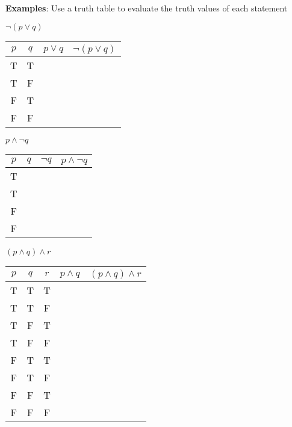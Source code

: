 \documentclass[addpoints]{exam}
\begin{document}
\textbf{Examples}: Use a truth table to evaluate the truth values of each statement
\begin{questions}
  \begin{minipage}{0.45\linewidth}
    \question $\lnot(p \lor q)$ \\ 
    \vspace{.01in}
      \begin{tabular}{ |c|c|c|c| } 
        \hline
        $p$ & $q$ & $p \lor q$ & $\lnot(p \lor q)$ \\ 
        \hline
        T & T & & \\ 
        T & F & & \\ 
        F & T & & \\ 
        F & F & & \\ 
        \hline
    \end{tabular}
    \vspace{0.01in}
  \end{minipage}
  \hfill
  \begin{minipage}{0.45\linewidth}
    \question $p \land \lnot q$ \\
      \vspace{.01in}
      \begin{tabular}{ |c|c|c|c| }
        \hline 
        $p$ & $q$ & $\lnot q$ & $p \land \lnot q$ \\
        \hline 
        T & & & \\
        T & & & \\
        F & & & \\
        F & & & \\
        \hline
      \end{tabular}
  \end{minipage}  

    
  \question $(p \land q) \land r$ \\
  \vspace{0.1in}
  \begin{tabular}{ |c|c|c|c|c| }
    \hline 
    $p$ & $q$ & $r$ & $p \land q$ & $(p \land q) \land r$ \\
    \hline 
    T & T &T& & \\
    T & T &F& & \\
    T & F &T& & \\
    T & F &F& & \\
    F & T &T& & \\
    F & T &F& & \\
    F & F &T& & \\
    F & F &F& & \\
    \hline
  \end{tabular}
\end{questions}
\end{document}
